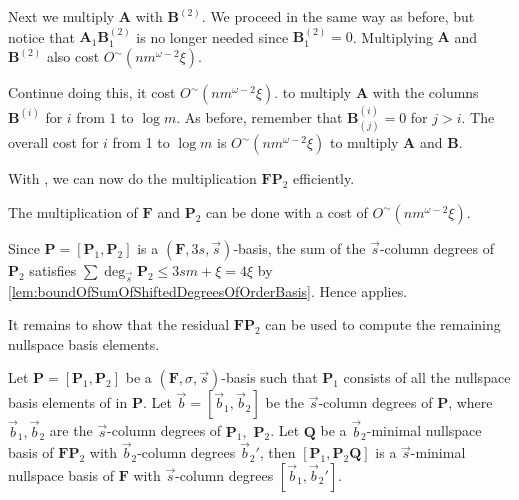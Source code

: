 \begin{pf}
Next we multiply $\mathbf{A}$ with $\mathbf{B}^{(2)}$. We proceed
in the same way as before, but notice that $\mathbf{A}_{1}\mathbf{B}_{1}^{(2)}$
is no longer needed since $\mathbf{B}_{1}^{(2)}=0$. Multiplying $\mathbf{A}$
and $\mathbf{B}^{(2)}$ also cost $O^{\sim}\left(nm^{\omega-2}\xi\right)$.

Continue doing this, it cost $O^{\sim}\left(nm^{\omega-2}\xi\right)$.
to multiply $\mathbf{A}$ with the columns $\mathbf{B}^{(i)}$ for
$i$ from $1$ to $\log m$.  As before, remember that $\mathbf{B}_{(j)}^{(i)}=0$
for $j>i$. The overall cost for $i$ from 1 to $\log m$ is $O^{\sim}\left(nm^{\omega-2}\xi\right)$
to multiply $\mathbf{A}$ and $\mathbf{B}$. 
\end{pf}
With , we can now do the
multiplication $\mathbf{F}\mathbf{P}_{2}$ efficiently.
\begin{cor}
\label{cor:multiplyingFP2}The multiplication of $\mathbf{F}$ and
$\mathbf{P}_{2}$ can be done with a cost of $O^{\sim}\left(nm^{\omega-2}\xi\right)$.\end{cor}
\begin{pf}
Since $\mathbf{P}=[\mathbf{P}_{1},\mathbf{P}_{2}]$ is a $(\mathbf{F},3s,\vec{s})$-basis,
the sum of the $\vec{s}$-column degrees of $\mathbf{P}_{2}$ satisfies
$\sum\deg_{\vec{s}}\mathbf{P}_{2}\le3sm+\xi=4\xi$ by \ref{lem:boundOfSumOfShiftedDegreesOfOrderBasis}.
Hence  applies.
\end{pf}
It remains to show that the residual $\mathbf{F}\mathbf{P}_{2}$ can
be used to compute the remaining nullspace basis elements.
\begin{lem}
\label{lem:continueComputingNullspaceBasisByColumns}Let $\mathbf{P}=\left[\mathbf{P}_{1},\mathbf{P}_{2}\right]$
be a $\left(\mathbf{F},\sigma,\vec{s}\right)$-basis such that $\mathbf{P}_{1}$
consists of all the nullspace basis elements of in $\mathbf{P}$.
Let $\vec{b}=\left[\vec{b}_{1},\vec{b}_{2}\right]$ be the $\vec{s}$-column
degrees of $\mathbf{P}$, where $\vec{b}_{1},\vec{b}_{2}$ are the
$\vec{s}$-column degrees of $\mathbf{P}_{1},$ $\mathbf{P}_{2}$.
Let $\mathbf{Q}$ be a $\vec{b}_{2}$-minimal nullspace basis of $\mathbf{F}\mathbf{P}_{2}$
with $\vec{b}_{2}$-column degrees $\vec{b}_{2}'$, then $\left[\mathbf{P}_{1},\mathbf{P}_{2}\mathbf{Q}\right]$
is a $\vec{s}$-minimal nullspace basis of $\mathbf{F}$ with $\vec{s}$-column
degrees $\left[\vec{b}_{1},\vec{b}_{2}'\right]$.\end{lem}
